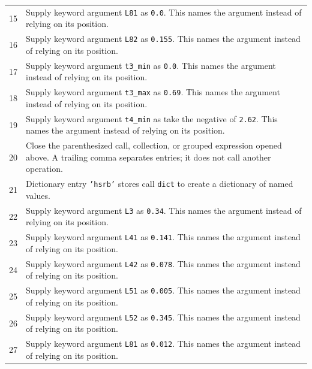 \documentclass[11pt,a4paper]{book}
\begin{document}
\begin{longtable}{r p{}}
15 & Supply keyword argument \texttt{L81} as \texttt{0.0}. This names the argument instead of relying on its position. \\

16 & Supply keyword argument \texttt{L82} as \texttt{0.155}. This names the argument instead of relying on its position. \\

17 & Supply keyword argument \texttt{t3\_min} as \texttt{0.0}. This names the argument instead of relying on its position. \\

18 & Supply keyword argument \texttt{t3\_max} as \texttt{0.69}. This names the argument instead of relying on its position. \\

19 & Supply keyword argument \texttt{t4\_min} as take the negative of \texttt{2.62}. This names the argument instead of relying on its position. \\

20 & Close the parenthesized call, collection, or grouped expression opened above. A trailing comma separates entries; it does not call another operation. \\

21 & Dictionary entry \texttt{'hsrb'} stores call \texttt{dict} to create a dictionary of named values. \\

22 & Supply keyword argument \texttt{L3} as \texttt{0.34}. This names the argument instead of relying on its position. \\

23 & Supply keyword argument \texttt{L41} as \texttt{0.141}. This names the argument instead of relying on its position. \\

24 & Supply keyword argument \texttt{L42} as \texttt{0.078}. This names the argument instead of relying on its position. \\

25 & Supply keyword argument \texttt{L51} as \texttt{0.005}. This names the argument instead of relying on its position. \\

26 & Supply keyword argument \texttt{L52} as \texttt{0.345}. This names the argument instead of relying on its position. \\

27 & Supply keyword argument \texttt{L81} as \texttt{0.012}. This names the argument instead of relying on its position. \\


\end{longtable}
\end{document}
